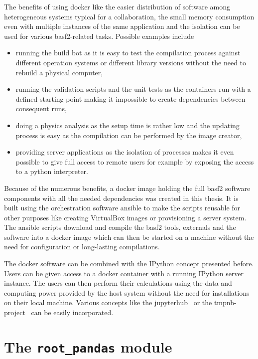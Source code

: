 The benefits of using docker like the easier distribution of software among heterogeneous systems typical for a collaboration, the small memory consumption even with multiple instances of the same application and the isolation can be used for various basf2-related tasks. Possible examples include
\begin{itemize}
 \item running the build bot as it is easy to test the compilation process against different operation systems or different library versions without the need to rebuild a physical computer,
 \item running the validation scripts and the unit tests as the containers run with a defined starting point making it impossible to create dependencies between consequent runs,
 \item doing a physics analysis as the setup time is rather low and the updating process is easy as the compilation can be performed by the image creator,
 \item providing server applications as the isolation of processes makes it even possible to give full access to remote users for example by exposing the access to a python interpreter.
\end{itemize}

Because of the numerous benefits, a docker image holding the full basf2 software components with all the needed dependencies was created in this thesis. It is built using the orchestration software ansible \cite{ansible} to make the scripts reusable for other purposes like creating VirtualBox images or provisioning a server system. The ansible scripts download and compile the basf2 tools, externals and the software into a docker image which can then be started on a machine without the need for configuration or long-lasting compilations.

The docker software can be combined with the IPython concept presented before. Users can be given access to a docker container with a running IPython server instance. The users can then perform their calculations using the data and computing power provided by the host system without the need for installations on their local machine. Various concepts like the jupyterhub~\cite{jupyterhub} or the tmpnb-project~\cite{tmpnb} can be easily incorporated. 

\section{The \texttt{root\_pandas} module}

